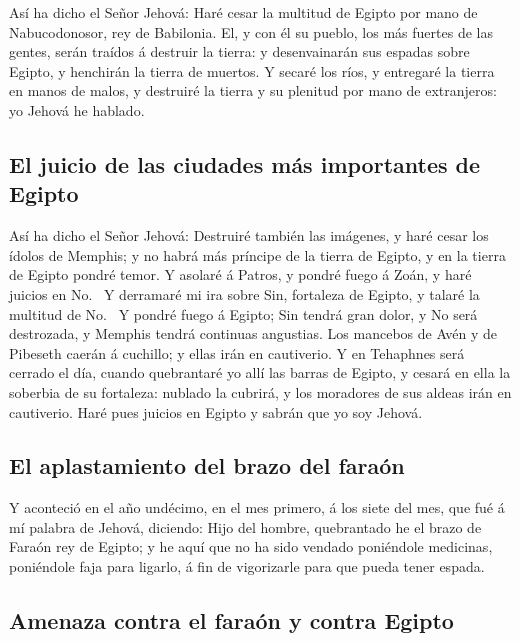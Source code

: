  Así ha dicho el Señor Jehová: Haré cesar la multitud de
Egipto por mano de Nabucodonosor, rey de Babilonia.  El, y
con él su pueblo, los más fuertes de las gentes, serán traídos á
destruir la tierra: y desenvainarán sus espadas sobre Egipto, y
henchirán la tierra de muertos.  Y secaré los ríos, y
entregaré la tierra en manos de malos, y destruiré la tierra y su
plenitud por mano de extranjeros: yo Jehová he hablado.

\hypertarget{el-juicio-de-las-ciudades-muxe1s-importantes-de-egipto}{%
\subsection{El juicio de las ciudades más importantes de
Egipto}\label{el-juicio-de-las-ciudades-muxe1s-importantes-de-egipto}}

 Así ha dicho el Señor Jehová: Destruiré también las
imágenes, y haré cesar los ídolos de Memphis; y no habrá más príncipe de
la tierra de Egipto, y en la tierra de Egipto pondré temor.
 Y asolaré á Patros, y pondré fuego á Zoán, y haré juicios
en No.~ Y derramaré mi ira sobre Sin, fortaleza de Egipto,
y talaré la multitud de No.~ Y pondré fuego á Egipto; Sin
tendrá gran dolor, y No será destrozada, y Memphis tendrá continuas
angustias.  Los mancebos de Avén y de Pibeseth caerán á
cuchillo; y ellas irán en cautiverio.  Y en Tehaphnes será
cerrado el día, cuando quebrantaré yo allí las barras de Egipto, y
cesará en ella la soberbia de su fortaleza: nublado la cubrirá, y los
moradores de sus aldeas irán en cautiverio.  Haré pues
juicios en Egipto y sabrán que yo soy Jehová.

\hypertarget{el-aplastamiento-del-brazo-del-farauxf3n}{%
\subsection{El aplastamiento del brazo del
faraón}\label{el-aplastamiento-del-brazo-del-farauxf3n}}

 Y aconteció en el año undécimo, en el mes primero, á los
siete del mes, que fué á mí palabra de Jehová, diciendo: 
Hijo del hombre, quebrantado he el brazo de Faraón rey de Egipto; y he
aquí que no ha sido vendado poniéndole medicinas, poniéndole faja para
ligarlo, á fin de vigorizarle para que pueda tener espada.

\hypertarget{amenaza-contra-el-farauxf3n-y-contra-egipto}{%
\subsection{Amenaza contra el faraón y contra
Egipto}\label{amenaza-contra-el-farauxf3n-y-contra-egipto}}

